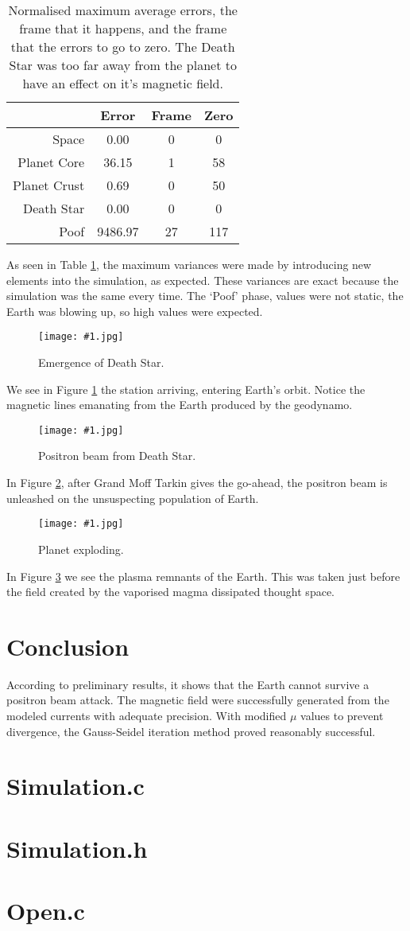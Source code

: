 \documentclass[twocolumn]{article}
\def\fig#1#2{\begin{figure}[!ht]\begin{center}
\texttt{[image: \#1.jpg]}
\end{center}\caption{#2}\label{#1}\end{figure}}
\begin{document}
\begin{table}[!htb]
\begin{center}
\begin{tabular}{r c c c}
 & Error & Frame & Zero \\
\hline
Space &         0.00 & 0 &  0 \\
Planet Core &  36.15 & 1 & 58 \\
Planet Crust &  0.69 & 0 & 50 \\
Death Star &    0.00 & 0 &  0 \\
Poof &       9486.97 &27 &117
\end{tabular}
\caption{Normalised maximum average errors, the frame that it happens,
and the frame that the errors to go to zero. The Death Star was too
far away from the planet to have an effect on it's magnetic field.}
\end{center}
\label{err}
\end{table}

As seen in Table \ref{err}, the maximum variances were made by introducing new elements into the simulation, as expected. These variances are exact because the simulation was the same every time. The `Poof' phase, values
were not static, the Earth was blowing up, so high values were expected.

\fig{death}{Emergence of Death Star.}

We see in Figure \ref{death} the station arriving, entering Earth's orbit.
Notice the magnetic lines emanating from the Earth produced by the
geodynamo.

\fig{positron}{Positron beam from Death Star.}

In Figure \ref{positron}, after Grand Moff Tarkin gives the go-ahead, the
positron beam is unleashed on the unsuspecting population of Earth.

\fig{exploded}{Planet exploding.}

In Figure \ref{exploded} we see the plasma remnants of the Earth. This
was taken just before the field created by the vaporised magma
dissipated thought space.

\section{Conclusion}
According to preliminary results, it shows that the Earth cannot
survive a positron beam attack. The magnetic field were
successfully generated from the modeled currents with adequate
precision. With modified $\mu$ values to prevent divergence, the
Gauss-Seidel iteration method proved reasonably successful.



\onecolumn
\appendix

\section{Simulation.c}
{\tiny {}}

\section{Simulation.h}
{\tiny {}}

\section{Open.c}
{\tiny {}}
\end{document}
